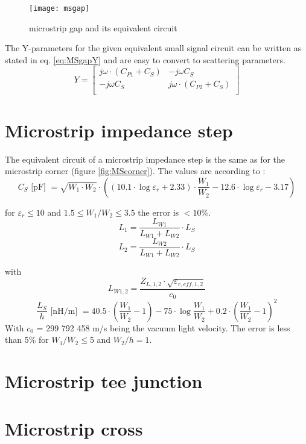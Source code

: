 \begin{figure}[ht]
\begin{center}
\texttt{[image: msgap]}
\end{center}
\caption{microstrip gap and its equivalent circuit}
\label{fig:MSgap}
\end{figure}
\FloatBarrier

The Y-parameters for the given equivalent small signal circuit can be
written as stated in eq. \eqref{eq:MSgapY} and are easy to convert to
scattering parameters.
\begin{equation}
Y =
\begin{bmatrix}
j\omega\cdot \left(C_{P1} + C_S\right) & -j\omega C_S\\
-j\omega C_S & j\omega\cdot \left(C_{P2} + C_S\right)\\
\end{bmatrix}
\label{eq:MSgapY}
\end{equation}

\section{Microstrip impedance step}

The equivalent circuit of a microstrip impedance step is the same as
for the microstrip corner (figure \ref{fig:MScorner}).  The values are
according to \cite{Gupta}:
\begin{equation}
C_S \textrm{ [pF] } = \sqrt{W_1\cdot W_2}\cdot\left( (10.1\cdot\log{\varepsilon_r} + 2.33)\cdot
     \dfrac{W_1}{W_2} - 12.6\cdot\log{\varepsilon_r} - 3.17 \right)
\end{equation}

for $\varepsilon_r\le 10$ and $1.5\le W_1/W_2\le 3.5$ the error is
$<10$\%.
\begin{equation}
L_1 = \frac{L_{W1}}{L_{W1}+L_{W2}}\cdot L_S
\end{equation}
\begin{equation}
L_2 = \frac{L_{W2}}{L_{W1}+L_{W2}}\cdot L_S
\end{equation}

with
\begin{equation}
L_{W1,2} = \dfrac{Z_{L,1,2}\cdot\sqrt{\varepsilon_{r,eff,1,2}}}{c_0}
\end{equation}
\begin{equation}
\frac{L_S}{h} \textrm{ [nH/m] } = 40.5\cdot\left( \dfrac{W_1}{W_2}-1 \right)
      - 75\cdot\log{\dfrac{W_1}{W_2}} + 0.2\cdot \left( \dfrac{W_1}{W_2}-1 \right)^2
\end{equation}
With $c_0$ = 299 792 458 m/s being the vacuum light velocity.  The
error is less than 5\% for $W_1/W_2\le 5$ and $W_2/h = 1$.

\section{Microstrip tee junction}

\section{Microstrip cross}

